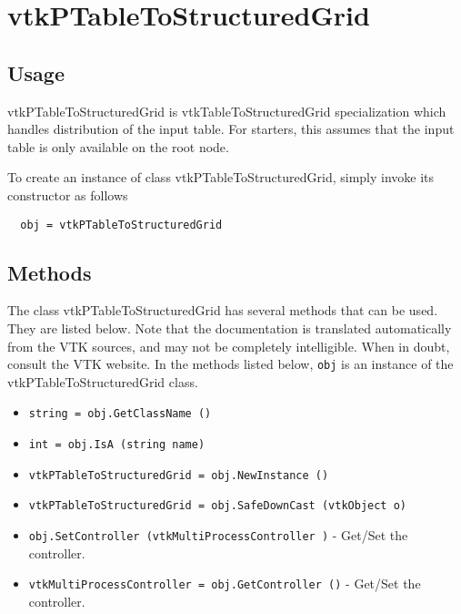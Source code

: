 \section{vtkPTableToStructuredGrid}

\subsection{Usage}

 vtkPTableToStructuredGrid is vtkTableToStructuredGrid specialization
 which handles distribution of the input table.
 For starters, this assumes that the input table is only available on the root
 node.

To create an instance of class vtkPTableToStructuredGrid, simply
invoke its constructor as follows
\begin{verbatim}
  obj = vtkPTableToStructuredGrid
\end{verbatim}
\subsection{Methods}

The class vtkPTableToStructuredGrid has several methods that can be used.
  They are listed below.
Note that the documentation is translated automatically from the VTK sources,
and may not be completely intelligible.  When in doubt, consult the VTK website.
In the methods listed below, \verb|obj| is an instance of the vtkPTableToStructuredGrid class.
\begin{itemize}
\item  \verb|string = obj.GetClassName ()|

\item  \verb|int = obj.IsA (string name)|

\item  \verb|vtkPTableToStructuredGrid = obj.NewInstance ()|

\item  \verb|vtkPTableToStructuredGrid = obj.SafeDownCast (vtkObject o)|

\item  \verb|obj.SetController (vtkMultiProcessController )| -  Get/Set the controller.

\item  \verb|vtkMultiProcessController = obj.GetController ()| -  Get/Set the controller.

\end{itemize}
